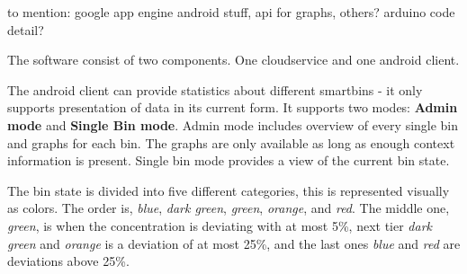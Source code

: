 to mention:
google app engine
android stuff, api for graphs, others?
arduino code detail?


The software consist of two components. One cloudservice and one android client.

The android client can provide statistics about different smartbins - it only supports  presentation of data in its current form.
It supports two modes: \textbf{Admin mode} and \textbf{Single Bin mode}.
Admin mode includes overview of every single bin and graphs for each bin. The graphs are only available as long as enough context information is present.
 Single bin mode provides a view of the current bin state.
 
 The bin state is divided into five different categories, this is represented visually as colors.
 The order is, \textit{blue}, \textit{dark green}, \textit{green}, \textit{orange}, and \textit{red}.
 The middle one, \textit{green}, is when the concentration is deviating with at most 5\%, next tier \textit{dark green} and \textit{orange} is a deviation of at most 25\%, and the last ones \textit{blue} and \textit{red} are deviations above 25\%.